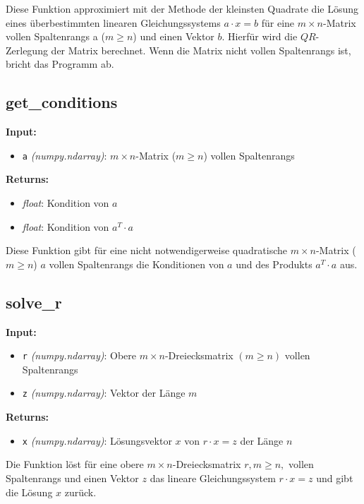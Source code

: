 \documentclass[a4paper, 11pt]{scrartcl}
\begin{document}
\noindent Diese Funktion approximiert mit der Methode der kleinsten Quadrate die Lösung eines überbestimmten linearen Gleichungssystems $a \cdot x = b$ für eine $m \times n$-Matrix vollen Spaltenrangs a ($m\geq n$) und einen Vektor $b$. Hierfür wird die $QR$-Zerlegung der Matrix berechnet. Wenn die Matrix nicht vollen Spaltenrangs ist, bricht das Programm ab.



\subsection{get\_conditions}

\textbf{Input:}
\begin{itemize}
    \item \texttt{a} \textit{(numpy.ndarray)}:
    $m \times n$-Matrix ($m\geq n$) vollen Spaltenrangs
\end{itemize}

\noindent \textbf{Returns:}
\begin{itemize}
    \item \textit{float}: Kondition von $a$
    \item \textit{float}: Kondition von $a^T \cdot a$
\end{itemize}

\noindent Diese Funktion gibt für eine nicht notwendigerweise quadratische $m \times n$-Matrix ($m \geq n$) $a$ vollen Spaltenrangs die Konditionen von $a$ und des Produkts $a^T \cdot a$ aus.



\subsection{solve\_r}

\textbf{Input:}
\begin{itemize}
    \item \texttt{r} \textit{(numpy.ndarray)}:
    Obere $m \times n$-Dreiecksmatrix $(m \geq n)$ vollen Spaltenrangs
    \item \texttt{z} \textit{(numpy.ndarray)}:
    Vektor der Länge $m$
\end{itemize}

\noindent \textbf{Returns:}
\begin{itemize}
    \item \texttt{x} \textit{(numpy.ndarray)}:
    Lösungsvektor $x$ von $r \cdot x = z$ der Länge $n$
\end{itemize}

\noindent Die Funktion löst für eine obere $m \times n$-Dreiecksmatrix $r, m \geq n,$ vollen Spaltenrangs und einen Vektor $z$ das lineare Gleichungssystem $r \cdot x = z$ und gibt die Lösung $x$ zurück.
\end{document}
